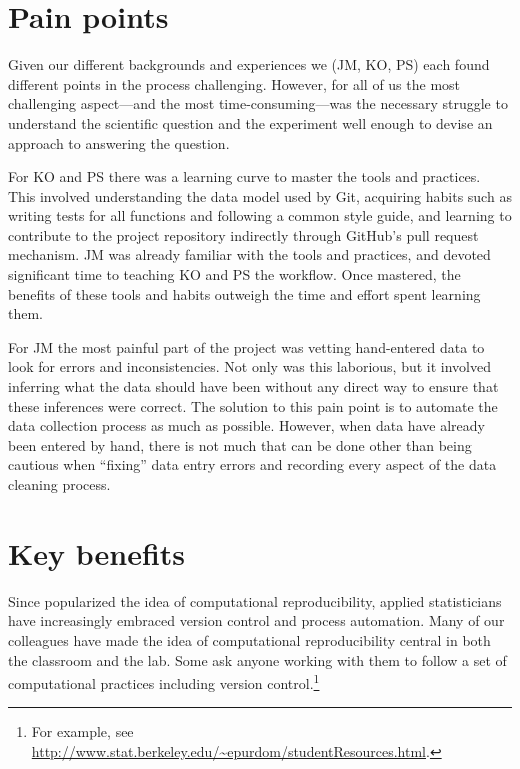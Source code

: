 \documentclass[]{article}
\begin{document}
\section{Pain points}\label{pain-points}

Given our different backgrounds and experiences we (JM, KO, PS) each found
different points in the process challenging. 
However, for all of us the most challenging aspect---and the most 
time-consuming---was the necessary
struggle to understand the scientific question and the experiment
well enough to devise an approach to answering the question.

For KO and PS there was a learning curve to master the tools and practices.
This involved understanding the data model used by Git, acquiring habits such
as writing tests for all functions and following a common style guide, and
learning to contribute to the project repository indirectly through GitHub's
pull request mechanism.
JM was already familiar with the tools and practices, and devoted significant time
to teaching KO and PS the workflow.
Once mastered, the benefits of these tools and habits outweigh the time and effort
spent learning them.

For JM the most painful part of the project was vetting hand-entered data
to look for errors and inconsistencies.
Not only was this laborious, but it involved inferring what the data
should have been without any direct way to ensure that these inferences were
correct.
The solution to this pain point is to automate the data collection process as
much as possible.
However, when data have already been entered by hand, there is not much that can
be done other than being cautious when ``fixing'' data entry errors and recording
every aspect of the data cleaning process.

\section{Key benefits}\label{key-benefits}

Since \citet{buckheit1995wavelab} popularized the idea of computational
reproducibility, applied statisticians have increasingly embraced version control
and process automation.
Many of our colleagues have made the idea of computational reproducibility
central in both the classroom and the lab.
Some ask anyone working with them to follow a set of computational practices
including version control.\footnote{
  For example, see
  \url{http://www.stat.berkeley.edu/~epurdom/studentResources.html}.
}
\end{document}
